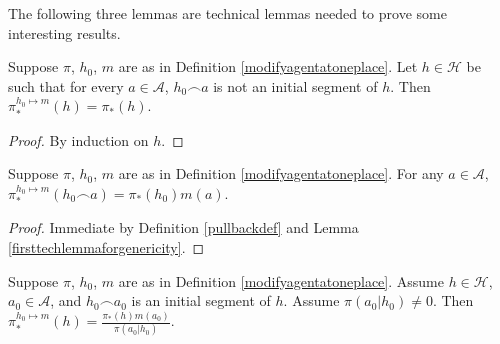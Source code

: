 \documentclass[runningheads]{llncs}
\begin{document}
The following three lemmas are technical lemmas needed to prove
some interesting results.

\begin{lemma}
\label{firsttechlemmaforgenericity}
    Suppose $\pi$, $h_0$, $m$ are as in Definition \ref{modifyagentatoneplace}.
    Let $h\in\mathcal H$ be such that
    for every $a\in\mathcal A$,
    $h_0\frown a$ is not an initial segment of $h$.
    Then $\pi^{h_0\mapsto m}_*(h)=\pi_*(h)$.
\end{lemma}

\begin{proof}
    By induction on $h$.
\end{proof}

\begin{lemma}
\label{thirdtechlemmaforgenericity}
    Suppose $\pi$, $h_0$, $m$ are as in Definition \ref{modifyagentatoneplace}.
    For any $a\in\mathcal A$,
    $\pi^{h_0\mapsto m}_*(h_0\frown a)=\pi_*(h_0)m(a)$.
\end{lemma}

\begin{proof}
    Immediate by Definition \ref{pullbackdef} and Lemma \ref{firsttechlemmaforgenericity}.
\end{proof}

\begin{lemma}
\label{secondtechlemmaforgenericity}
    Suppose $\pi$, $h_0$, $m$ are as in Definition \ref{modifyagentatoneplace}.
    Assume $h\in\mathcal H$, $a_0\in\mathcal A$, and $h_0\frown a_0$ is
    an initial segment of $h$. Assume $\pi(a_0|h_0)\not=0$. Then
    $\pi^{h_0\mapsto m}_*(h) = \frac{\pi_*(h)m(a_0)}{\pi(a_0|h_0)}$.
\end{lemma}
\end{document}
